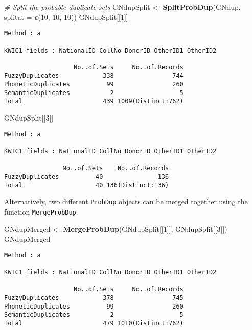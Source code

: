 \documentclass[
]{article}
\newenvironment{Shaded}{\begin{snugshade}}{\end{snugshade}}
\newcommand{\CommentTok}[1]{\textcolor[rgb]{0.56,0.35,0.01}{\textit{#1}}}
\newcommand{\DataTypeTok}[1]{\textcolor[rgb]{0.13,0.29,0.53}{#1}}
\newcommand{\DecValTok}[1]{\textcolor[rgb]{0.00,0.00,0.81}{#1}}
\newcommand{\KeywordTok}[1]{\textcolor[rgb]{0.13,0.29,0.53}{\textbf{#1}}}
\newcommand{\NormalTok}[1]{#1}
\newcommand{\StringTok}[1]{\textcolor[rgb]{0.31,0.60,0.02}{#1}}
\begin{document}
\begin{Shaded}
\begin{Highlighting}[]
\CommentTok{# Split the probable duplicate sets}
\NormalTok{GNdupSplit <-}\StringTok{ }\KeywordTok{SplitProbDup}\NormalTok{(GNdup, }\DataTypeTok{splitat =} \KeywordTok{c}\NormalTok{(}\DecValTok{10}\NormalTok{, }\DecValTok{10}\NormalTok{, }\DecValTok{10}\NormalTok{))}
\NormalTok{GNdupSplit[[}\DecValTok{1}\NormalTok{]]}
\end{Highlighting}
\end{Shaded}

\begin{verbatim}
Method : a

KWIC1 fields : NationalID CollNo DonorID OtherID1 OtherID2
 
                   No..of.Sets     No..of.Records
FuzzyDuplicates            338                744
PhoneticDuplicates          99                260
SemanticDuplicates           2                  5
Total                      439 1009(Distinct:762)
\end{verbatim}

\begin{Shaded}
\begin{Highlighting}[]
\NormalTok{GNdupSplit[[}\DecValTok{3}\NormalTok{]]}
\end{Highlighting}
\end{Shaded}

\begin{verbatim}
Method : a

KWIC1 fields : NationalID CollNo DonorID OtherID1 OtherID2
 
                No..of.Sets    No..of.Records
FuzzyDuplicates          40               136
Total                    40 136(Distinct:136)
\end{verbatim}

Alternatively, two different \texttt{ProbDup} objects can be merged
together using the function \texttt{MergeProbDup}.

\begin{Shaded}
\begin{Highlighting}[]
\NormalTok{GNdupMerged <-}\StringTok{ }\KeywordTok{MergeProbDup}\NormalTok{(GNdupSplit[[}\DecValTok{1}\NormalTok{]], GNdupSplit[[}\DecValTok{3}\NormalTok{]])}
\NormalTok{GNdupMerged}
\end{Highlighting}
\end{Shaded}

\begin{verbatim}
Method : a

KWIC1 fields : NationalID CollNo DonorID OtherID1 OtherID2
 
                   No..of.Sets     No..of.Records
FuzzyDuplicates            378                745
PhoneticDuplicates          99                260
SemanticDuplicates           2                  5
Total                      479 1010(Distinct:762)
\end{verbatim}
\end{document}
